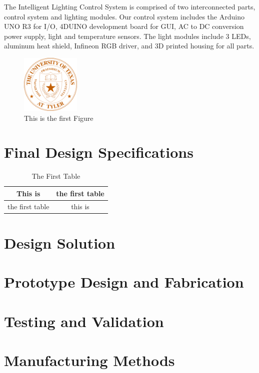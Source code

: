 \documentclass[12pt,a4paper]{report}
\begin{document}
The Intelligent Lighting Control System is comprised of two interconnected parts, control system and lighting modules. Our control system includes the Arduino UNO R3 for I/O, 4DUINO development board for GUI, AC to DC conversion power supply, light and temperature sensors. The light modules include 3 LEDs, aluminum heat shield, Infineon RGB driver, and 3D printed housing for all parts.
\begin{figure}
	\centering
	\includegraphics[width=0.25\textwidth]{uttseal.png}\par\vspace{0.1cm}
	\caption{This is the first Figure}
\end{figure}

\section{Final Design Specifications}

\begin{table}
	\centering
	\begin{tabular}{|c|c|}
	\hline 
	This is & the first table \\ 
	\hline 
	the first table & this is \\ 
	\hline 
	\end{tabular}
	\caption{The First Table} 
\end{table}
\blindtext
\section{Design Solution}
\blindtext
\section{Prototype Design and Fabrication}
\blindtext
\section{Testing and Validation}
\blindtext
\section{Manufacturing Methods}
\blindtext
\end{document}
